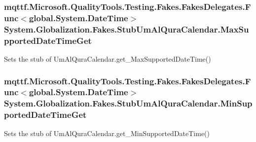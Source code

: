 \hypertarget{class_system_1_1_globalization_1_1_fakes_1_1_stub_um_al_qura_calendar_a2b64f3a076de2ddd5a2abfc2424719dc}{
\subsubsection[{Max\-Supported\-Date\-Time\-Get}]{\setlength{\rightskip}{0pt plus 5cm}mqttf.\-Microsoft.\-Quality\-Tools.\-Testing.\-Fakes.\-Fakes\-Delegates.\-Func$<$global.\-System.\-Date\-Time$>$ System.\-Globalization.\-Fakes.\-Stub\-Um\-Al\-Qura\-Calendar.\-Max\-Supported\-Date\-Time\-Get}}\label{class_system_1_1_globalization_1_1_fakes_1_1_stub_um_al_qura_calendar_a2b64f3a076de2ddd5a2abfc2424719dc}


Sets the stub of Um\-Al\-Qura\-Calendar.\-get\-\_\-\-Max\-Supported\-Date\-Time()

\hypertarget{class_system_1_1_globalization_1_1_fakes_1_1_stub_um_al_qura_calendar_a8b493e7ef4adf5c4aabe682572a32d50}{
\subsubsection[{Min\-Supported\-Date\-Time\-Get}]{\setlength{\rightskip}{0pt plus 5cm}mqttf.\-Microsoft.\-Quality\-Tools.\-Testing.\-Fakes.\-Fakes\-Delegates.\-Func$<$global.\-System.\-Date\-Time$>$ System.\-Globalization.\-Fakes.\-Stub\-Um\-Al\-Qura\-Calendar.\-Min\-Supported\-Date\-Time\-Get}}\label{class_system_1_1_globalization_1_1_fakes_1_1_stub_um_al_qura_calendar_a8b493e7ef4adf5c4aabe682572a32d50}


Sets the stub of Um\-Al\-Qura\-Calendar.\-get\-\_\-\-Min\-Supported\-Date\-Time()

